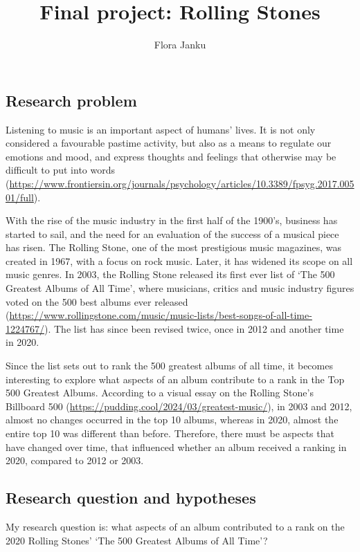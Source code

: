 \documentclass[
]{article}
\title{Final project: Rolling Stones}
\author{Flora Janku}
\date{}
\begin{document}
\maketitle

\subsection{Research problem}\label{research-problem}

Listening to music is an important aspect of humans' lives. It is not
only considered a favourable pastime activity, but also as a means to
regulate our emotions and mood, and express thoughts and feelings that
otherwise may be difficult to put into words
(\url{https://www.frontiersin.org/journals/psychology/articles/10.3389/fpsyg.2017.00501/full}).

With the rise of the music industry in the first half of the 1900's,
business has started to sail, and the need for an evaluation of the
success of a musical piece has risen. The Rolling Stone, one of the most
prestigious music magazines, was created in 1967, with a focus on rock
music. Later, it has widened its scope on all music genres. In 2003, the
Rolling Stone released its first ever list of `The 500 Greatest Albums
of All Time', where musicians, critics and music industry figures voted
on the 500 best albums ever released
(\url{https://www.rollingstone.com/music/music-lists/best-songs-of-all-time-1224767/}).
The list has since been revised twice, once in 2012 and another time in
2020.

Since the list sets out to rank the 500 greatest albums of all time, it
becomes interesting to explore what aspects of an album contribute to a
rank in the Top 500 Greatest Albums. According to a visual essay on the
Rolling Stone's Billboard 500
(\url{https://pudding.cool/2024/03/greatest-music/}), in 2003 and 2012,
almost no changes occurred in the top 10 albums, whereas in 2020, almost
the entire top 10 was different than before. Therefore, there must be
aspects that have changed over time, that influenced whether an album
received a ranking in 2020, compared to 2012 or 2003.

\subsection{Research question and
hypotheses}\label{research-question-and-hypotheses}

My research question is: what aspects of an album contributed to a rank
on the 2020 Rolling Stones' `The 500 Greatest Albums of All Time'?
\end{document}
